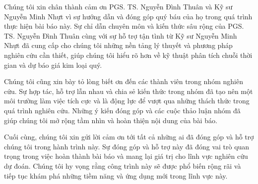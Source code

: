 
Chúng tôi xin chân thành cảm ơn PGS. TS. Nguyễn Đình Thuân và Kỹ sư Nguyễn Minh Nhựt vì sự hướng dẫn và đóng góp quý báu của họ trong quá trình thực hiện bài báo này. Sự chỉ dẫn chuyên môn và kiến thức sâu rộng của PGS. TS. Nguyễn Đình Thuân cùng với sự hỗ trợ tận tình từ Kỹ sư Nguyễn Minh Nhựt đã cung cấp cho chúng tôi những nền tảng lý thuyết và phương pháp nghiên cứu cần thiết, giúp chúng tôi hiểu rõ hơn về kỹ thuật phân tích chuỗi thời gian và dự báo giá kim loại quý.

Chúng tôi cũng xin bày tỏ lòng biết ơn đến các thành viên trong nhóm nghiên cứu. Sự hợp tác, hỗ trợ lẫn nhau và chia sẻ kiến thức trong nhóm đã tạo nên một môi trường làm việc tích cực và là động lực để vượt qua những thách thức trong quá trình nghiên cứu. Những ý kiến đóng góp và các cuộc thảo luận nhóm đã giúp chúng tôi mở rộng tầm nhìn và hoàn thiện nội dung của bài báo.

Cuối cùng, chúng tôi xin gửi lời cảm ơn tới tất cả những ai đã đóng góp và hỗ trợ chúng tôi trong hành trình này. Sự đóng góp và hỗ trợ này đã đóng vai trò quan trọng trong việc hoàn thành bài báo và mang lại giá trị cho lĩnh vực nghiên cứu dự đoán. Chúng tôi hy vọng rằng công trình này sẽ được phổ biến rộng rãi và tiếp tục khám phá những tiềm năng và ứng dụng mới trong lĩnh vực này.